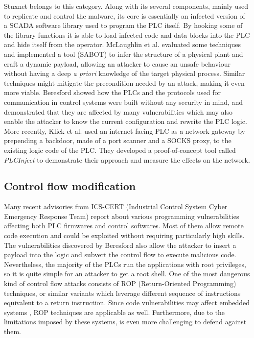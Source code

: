 Stuxnet \cite{stuxnet} belongs to this category. Along with its several components, mainly used to replicate and control the malware,
its core is essentially an infected version of a SCADA software library used to program the PLC itself.
By hooking some of the library functions it is able to load infected code and data blocks into the PLC and hide itself from the operator.
McLaughlin et al. \cite{dynamic-payload,sabot} evaluated some techniques and implemented a tool (SABOT) to infer the structure of a physical plant and craft a dynamic payload,
allowing an attacker to cause an unsafe behaviour without having a deep \emph{a priori} knowledge of the target physical process.
Similar techniques might mitigate the precondition needed by an attack, making it even more viable.
Beresford \cite{siemens-s7} showed how the PLCs and the protocols used for communication in control systems were built without any security in mind,
and demonstrated that they are affected by many vulnerabilities which may also enable the attacker to know the current configuration and rewrite the PLC logic.
More recently, Klick et al. \cite{plc-network} used an internet-facing PLC as a network gateway by prepending a backdoor, made of a port scanner and a SOCKS proxy,
to the existing logic code of the PLC. They developed a proof-of-concept tool called \emph{PLCInject} to demonstrate their approach and measure the effects on the network.


\subsection{Control flow modification}

Many recent advisories \cite{schneider-bof,rockwell-vuln,rockwell-vuln2,elcsoft-vuln} from ICS-CERT (Industrial Control System Cyber Emergency Response Team)
report about various programming vulnerabilities affecting both PLC firmwares and control softwares. Most of them allow remote code execution and could be exploited
without requiring particularly high skills.
The vulnerabilities discovered by Beresford \cite{siemens-s7} also allow the attacker to insert a payload into the logic and subvert the control flow to execute
malicious code. Nevertheless, the majority of the PLCs run the applications with root privileges, so it is quite simple for an attacker to get a root shell.
One of the most dangerous kind of control flow attacks consists of ROP (Return-Oriented Programming) techniques, or similar variants \cite{jop,no-ret}
which leverage different sequence of instructions equivalent to a return instruction.
Since code vulnerabilities may affect embedded systems \cite{schneider-bof,rockwell-vuln,rockwell-vuln2,elcsoft-vuln,siemens-s7}, ROP techniques
are applicable as well. Furthermore, due to the limitations imposed by these systems, is even more challenging to defend against them.


